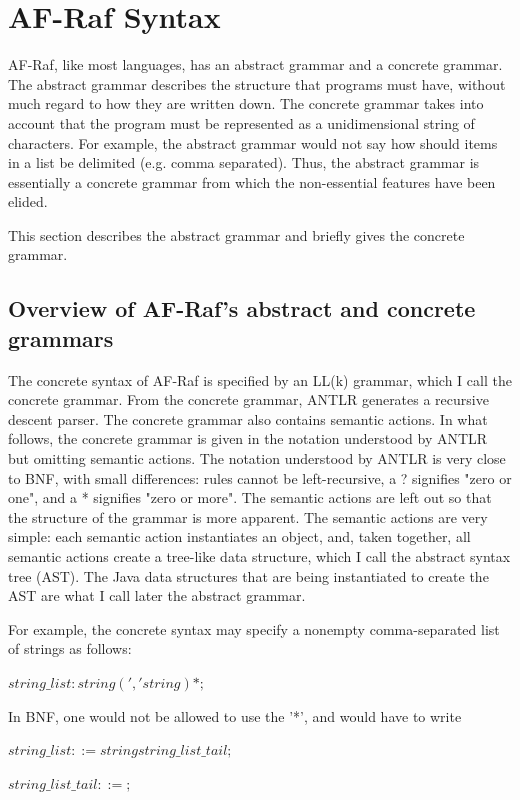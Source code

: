 \documentclass[a4paper,12pt,oneside,fleqn]{book} %
\begin{document}
\section{AF-Raf Syntax}\label{sec:langdef.syntax} %

AF-Raf, like most languages, has an abstract grammar and a concrete
grammar. The abstract grammar describes the structure that programs must
have, without much regard to how they are written down. The concrete
grammar takes into account that the program must be represented as a
unidimensional string of characters. For example, the abstract grammar
would not say how should items in a list be delimited (e.g. comma
separated). Thus, the abstract grammar is essentially a concrete grammar
from which the non-essential features have been elided.

This section describes the abstract grammar and briefly gives the concrete
grammar.

\subsection{Overview of AF-Raf's abstract and concrete grammars} %
The concrete syntax of AF-Raf is specified by an LL(k) grammar, which I call
the concrete grammar. From the concrete grammar, ANTLR generates a
recursive descent parser. The concrete grammar also contains semantic
actions. In what follows, the concrete grammar is given in the notation
understood by ANTLR but omitting semantic actions. The notation understood
by ANTLR is very close to BNF, with small differences: rules cannot be
left-recursive, a ? signifies "zero or one", and a * signifies "zero or
more". The semantic actions are left out so that the structure of the
grammar is more apparent. The semantic actions are very simple: each
semantic action instantiates an object, and, taken together, all semantic
actions create a tree-like data structure, which I call the abstract syntax
tree (AST). The Java data structures that are being instantiated to create
the AST are what I call later the abstract grammar.

For example, the concrete syntax may specify a nonempty comma-separated
list of strings as follows:

$string\_list: string (',' string)*;$

In BNF, one would not be allowed to use the '*', and would have to write

$string\_list ::= string string\_list\_tail;$

$string\_list\_tail ::= ;$
\end{document}
